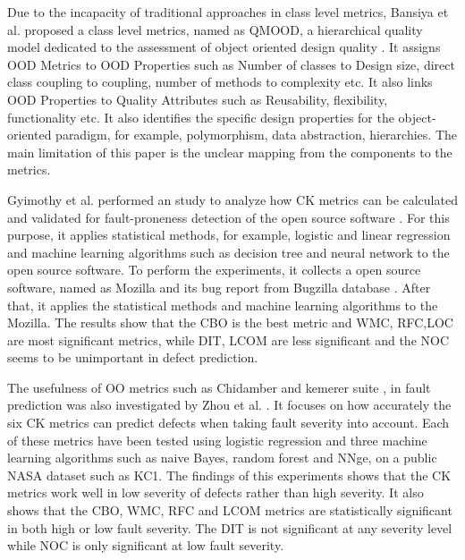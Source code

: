\documentclass[12pt]{report}
\begin{document}
Due to the incapacity of traditional approaches in class level metrics, Bansiya et al. proposed a class level metrics, named as QMOOD, a hierarchical quality model dedicated to the assessment of object oriented design quality \cite{bansiya2002hierarchical}. It assigns OOD Metrics to OOD Properties such as Number of classes to Design size, direct class coupling to coupling, number of methods to complexity etc. It also links OOD Properties to Quality Attributes such as Reusability, flexibility, functionality etc. It also identifies the specific design properties for the object-oriented paradigm, for example, polymorphism, data abstraction, hierarchies. The main limitation of this paper is the unclear mapping from the components to the metrics. 


Gyimothy et al. performed an study to analyze how CK metrics can be calculated and validated for fault-proneness detection of the open source software \cite{gyimothy2005empirical}. For this purpose, it applies statistical methods, for example, logistic and linear regression and machine learning algorithms such as decision tree and neural network to the open source software. To perform the experiments, it collects a open source software, named as Mozilla and its bug report from Bugzilla database \cite{BugzillaforMozilla}. After that, it applies the statistical methods and machine learning algorithms to the Mozilla. The results show that the CBO is the best metric and WMC, RFC,LOC are most significant metrics, while DIT, LCOM are less significant and the NOC seems to be unimportant in defect prediction.

The usefulness of OO metrics such as Chidamber and kemerer suite \cite{chidamber1994metrics}, in fault prediction was also investigated by Zhou et al. \cite{zhou2006empirical}. It focuses on how accurately the six CK metrics can predict defects when taking fault severity into account. Each of these metrics have been tested using logistic regression and three machine learning algorithms such as naive Bayes, random forest and NNge, on a public NASA dataset such as KC1. The findings of this experiments shows that the CK metrics work well in low severity of defects rather than high severity. It also shows that the CBO, WMC, RFC and LCOM metrics are statistically significant in both high or low fault severity. The DIT is not significant at any severity level while NOC is only significant at low fault severity. 
\end{document}
